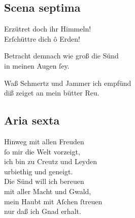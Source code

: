 \documentclass{ees}
\newenvironment{lyrics}[1]{%
  \subsection{#1}\nopagebreak%
  \begin{lyricslist}%
  \let\voice\item%
}{%
  \end{lyricslist}%
}
\begin{document}
\begin{lyrics}{Scena septima}
  \voice[Barmh.]
  Erzütret doch ihr Himmeln!\\
  Erſchüttre dich ô Erden!

  \voice[Schöpffer]
  Betracht demnach wie groß die Sünd\\
  in meinen Augen ſey.

  \voice[Adam]
  Waß Schmertz und Jammer ich empfünd\\
  diß zeiget an mein bütter Reu.
\end{lyrics}

\begin{lyrics}{Aria sexta}
  \voice[Adam]
  Hinweg mit allen Freuden\\
  ſo mir die Welt vorzeigt,\\
  ich bin zu Creutz und Leyden\\
  urbiethig und geneigt.\\[1ex]
  Die Sünd will ich bereuen\\
  mit aller Macht und Gwald,\\
  mein Haubt mit Aſchen ſtreuen\\
  nur daß ich Gnad erhalt.
\end{lyrics}
\end{document}
